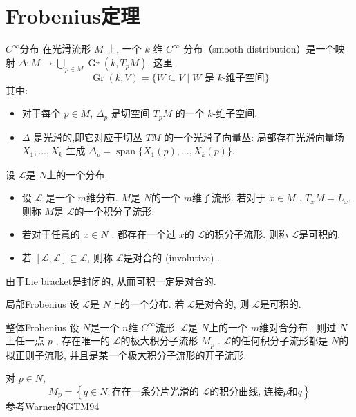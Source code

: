 \documentclass[../main.tex]{subfiles}
\begin{document}
\section{Frobenius定理}
\begin{definition}{\(  C^{\infty}  \)分布 }{}
  在光滑流形 $M$ 上, 一个 $k$-维 $C^{\infty}$ 分布（smooth distribution）是一个映射 $\Delta: M \to \bigcup_{p \in M} \operatorname{Gr}(k, T_p M)$, 这里\[
  \operatorname{Gr}(k, V) = \{ W \subseteq V \mid W \text{ 是 } k \text{-维子空间} \}
  \] 其中: 
\begin{itemize}
  \item 对于每个 $p \in M$, $\Delta_p$ 是切空间 $T_p M$ 的一个 $k$-维子空间.
  \item $\Delta$ 是光滑的,即它对应于切丛 $TM$ 的一个光滑子向量丛: 局部存在光滑向量场 $X_1, \dots, X_k$ 生成 $\Delta_p = \operatorname{span}\{X_1(p), \dots, X_k(p)\}$.
\end{itemize}

\end{definition}

\begin{definition}{}{}
     设 \(  \mathscr{L}  \)是 \(  N \)上的一个分布.   
  \begin{itemize}
    \item 设 \(\mathscr{L} \) 是一个 \(  m  \)维分布.  \(  M  \)是 \(  N  \)的一个 \(  m  \)维子流形. 若对于 \(  x \in M  \) . \(  T_{x}M= L_{x}  \), 则称 \(  M  \)是 \(  \mathscr{L} \)的一个积分子流形.          
    \item 若对于任意的 \(  x \in N  \) . 都存在一个过 \(  x  \)的 \(  \mathscr{L}  \)的积分子流形. 则称 \(  \mathscr{L}  \)是可积的.    
    \item 若 \(  \left[ \mathscr{L},\mathscr{L} \right]\subseteq \mathscr{L}   \), 则称 \(  \mathscr{L}  \)是对合的 (involutive) .    
  \end{itemize}
  
\end{definition}
\begin{remark}
  由于Lie bracket是封闭的, 从而可积一定是对合的.
\end{remark}


\begin{theorem}{局部Frobenius}{}
  设 \(  \mathscr{L}  \)是 \(  N  \)上的一个分布.  若 \(  \mathscr{L}  \)是对合的, 则 \(  \mathscr{L}  \)是可积的.     
\end{theorem}

\begin{theorem}{整体Frobenius}{}
  设 \(  N  \)是一个 \(  n  \)维  \(  C^{\infty}  \)流形. \(  \mathscr{L}  \)是 \(  N  \)上的一个 \(  m  \)维对合分布  . 则过 \(  N  \)上任一点 \(  p  \) , 存在唯一的 \(  \mathscr{L}  \)的极大积分子流形 \(  M_{p}  \) .        \(  \mathscr{L}  \)的任何积分子流形都是 \(  N  \)的拟正则子流形, 并且是某一个极大积分子流形的开子流形. 
\end{theorem}
\begin{proofsketch}
  对 \(  p \in N  \), \[
  M_{p}= \left\{ q \in N: \text{存在一条分片光滑的 }\mathscr{L}\text{的积分曲线, 连接}p\text{和}q \right\}
  \] 参考Warner的GTM94
\end{proofsketch}
\end{document}
